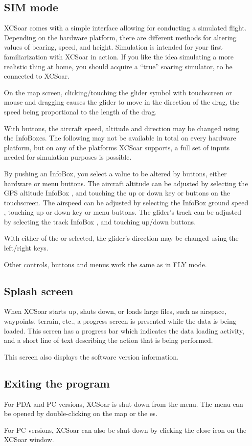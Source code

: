 \subsection*{SIM mode}
XCSoar comes with a simple interface allowing for conducting a simulated 
flight. Depending on the hardware platform, there are different 
methods for altering values of bearing, speed, and height.  Simulation is
intended for your first familiarization with XCSoar in action. If you like the 
idea simulating a more realistic thing at home, you should acquire a ``true''
soaring simulator, to be connected to XCSoar.

On the map screen, clicking/touching the glider symbol
with touchscreen or mouse and dragging 
causes the glider to move in the direction of the drag, the
speed being proportional to the length of the drag.

With buttons, the aircraft
speed, altitude and direction may be changed using the InfoBoxes.
The following may not be available in total on every hardware platform, but on 
any of the platforms XCSoar supports, a full set of inputs needed for 
simulation purposes is possible.

By pushing an InfoBox, you select a value to be altered by buttons, either
 hardware or menu buttons.
The aircraft altitude can be adjusted by selecting the GPS altitude
InfoBox , and touching the up or down key or buttons on the 
touchscreen.
The airspeed can be adjusted by selecting the InfoBox ground speed
, touching up or down key or menu buttons.
The glider's track  can be adjusted by selecting the track InfoBox
, and touching up/down buttons.

With either of the  or 
selected, the glider's direction may be changed using the left/right keys.

Other controls, buttons and menus work the same as in FLY mode.


\subsection*{Splash screen}
When XCSoar starts up, shuts down, or loads large files, such as airspace,
waypoints, terrain, etc., a progress screen is presented while the data is being
loaded. This screen has a progress bar which indicates the data loading
activity, and a short line of text describing the action that is being performed.

This screen also displays the software version information.

\subsection*{Exiting the program}
For PDA and PC versions, XCSoar is shut down from the menu. The menu can be
opened by double-clicking on the map or the \InfoBox es.
\begin{quote}
\end{quote}

For PC versions, XCSoar can also be shut down by clicking the close icon
on the XCSoar window.

